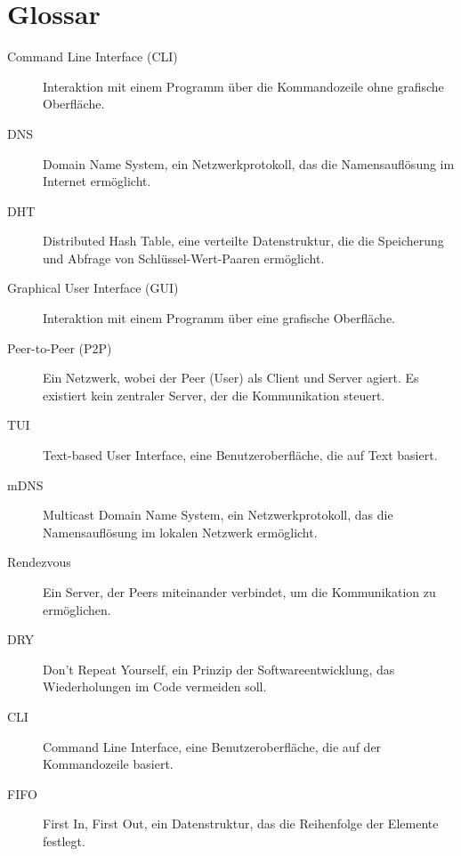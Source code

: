 \section*{Glossar}

\begin{description}
    \item[Command Line Interface (CLI)] Interaktion mit einem Programm über die Kommandozeile ohne grafische Oberfläche.
    \item[DNS] Domain Name System, ein Netzwerkprotokoll, das die Namensauflösung im Internet ermöglicht.
    \item[DHT] Distributed Hash Table, eine verteilte Datenstruktur, die die Speicherung und Abfrage von Schlüssel-Wert-Paaren ermöglicht.
    \item[Graphical User Interface (GUI)] Interaktion mit einem Programm über eine grafische Oberfläche.
    \item[Peer-to-Peer (P2P)] Ein Netzwerk, wobei der Peer (User) als Client und Server agiert. Es existiert kein zentraler Server, der die Kommunikation steuert.
    \item[TUI] Text-based User Interface, eine Benutzeroberfläche, die auf Text basiert.
    \item[mDNS] Multicast Domain Name System, ein Netzwerkprotokoll, das die Namensauflösung im lokalen Netzwerk ermöglicht.
    \item[Rendezvous] Ein Server, der Peers miteinander verbindet, um die Kommunikation zu ermöglichen.
    \item[DRY] Don't Repeat Yourself, ein Prinzip der Softwareentwicklung, das Wiederholungen im Code vermeiden soll.
    \item[CLI] Command Line Interface, eine Benutzeroberfläche, die auf der Kommandozeile basiert.
    \item[FIFO] First In, First Out, ein Datenstruktur, das die Reihenfolge der Elemente festlegt.
\end{description}


\newpage